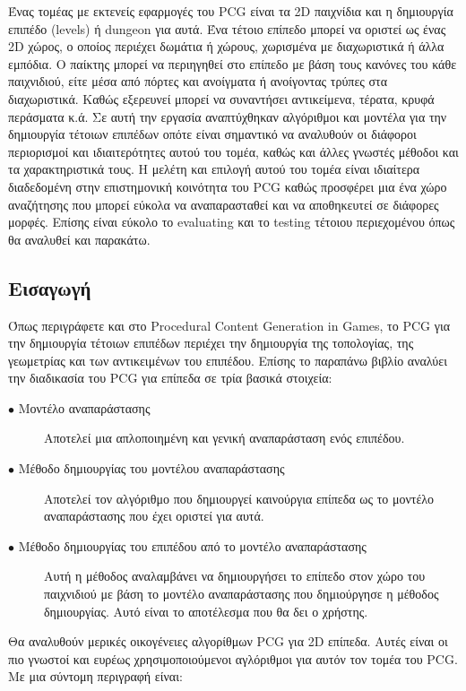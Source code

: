 Ένας τομέας με εκτενείς εφαρμογές του PCG είναι τα 2D παιχνίδια και η δημιουργία επιπέδο (levels) ή dungeon για αυτά. Ένα τέτοιο επίπεδο μπορεί να οριστεί ως ένας 2D χώρος, ο οποίος περιέχει δωμάτια ή χώρους, χωρισμένα με διαχωριστικά ή άλλα εμπόδια. Ο παίκτης μπορεί να περιηγηθεί στο επίπεδο με βάση τους κανόνες του κάθε παιχνιδιού, είτε μέσα από πόρτες και ανοίγματα ή ανοίγοντας τρύπες στα διαχωριστικά. Καθώς εξερευνεί μπορεί να συναντήσει αντικείμενα, τέρατα, κρυφά περάσματα κ.ά. 
\newline
Σε αυτή την εργασία αναπτύχθηκαν αλγόριθμοι και μοντέλα για την δημιουργία τέτοιων επιπέδων οπότε είναι σημαντικό να αναλυθούν οι διάφοροι περιορισμοί και ιδιαιτερότητες αυτού του τομέα, καθώς και άλλες γνωστές μέθοδοι και τα χαρακτηριστικά τους.
\newline
Η μελέτη και επιλογή αυτού του τομέα είναι ιδιαίτερα διαδεδομένη στην επιστημονική κοινότητα του PCG καθώς προσφέρει μια ένα χώρο αναζήτησης που μπορεί εύκολα να αναπαρασταθεί και να αποθηκευτεί σε διάφορες μορφές. Επίσης είναι εύκολο το evaluating και το testing τέτοιου περιεχομένου όπως θα αναλυθεί και παρακάτω.

\subsection{Εισαγωγή}
Όπως περιγράφετε και στο Procedural Content Generation in Games, το PCG για την δημιουργία τέτοιων επιπέδων περιέχει την δημιουργία της τοπολογίας, της γεωμετρίας και των αντικειμένων του επιπέδου. Επίσης το παραπάνω βιβλίο αναλύει την διαδικασία του PCG για επίπεδα σε τρία βασικά στοιχεία:

\begin{description}
  \item[$\bullet$ Μοντέλο αναπαράστασης] Αποτελεί μια απλοποιημένη και γενική αναπαράσταση ενός επιπέδου.
  \item[$\bullet$ Μέθοδο δημιουργίας του μοντέλου αναπαράστασης] Αποτελεί τον αλγόριθμο που δημιουργεί καινούργια επίπεδα ως το μοντέλο αναπαράστασης που έχει οριστεί για αυτά. 
    \item[$\bullet$ Μέθοδο δημιουργίας του επιπέδου από το μοντέλο αναπαράστασης] Αυτή η μέθοδος αναλαμβάνει να δημιουργήσει το επίπεδο στον χώρο του παιχνιδιού με βάση το μοντέλο αναπαράστασης που δημιούργησε η μέθοδος δημιουργίας. Αυτό είναι το αποτέλεσμα που θα δει ο χρήστης.
\end{description}

Θα αναλυθούν μερικές οικογένειες αλγορίθμων PCG για 2D επίπεδα. Αυτές είναι οι πιο γνωστοί και ευρέως χρησιμοποιούμενοι αγλόριθμοι για αυτόν τον τομέα του PCG. Με μια σύντομη περιγραφή είναι:


